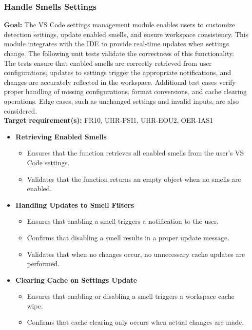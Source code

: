 \documentclass[12pt, titlepage]{article}
\begin{document}
\begin{enumerate}[label={\bf \textcolor{Maroon}{test-SRT-\arabic*}}, wide=0pt, font=\itshape]
\subsubsection{Handle Smells Settings}

\textbf{Goal:} The VS Code settings management module enables users to customize detection settings, update enabled smells, and ensure workspace consistency. This module integrates with the IDE to provide real-time updates when settings change. The following unit tests validate the correctness of this functionality.\\

\noindent The tests ensure that enabled smells are correctly retrieved from user configurations, updates to settings trigger the appropriate notifications, and changes are accurately reflected in the workspace. Additional test cases verify proper handling of missing configurations, format conversions, and cache clearing operations. Edge cases, such as unchanged settings and invalid inputs, are also considered.\\

\noindent \textbf{Target requirement(s):} FR10, UHR-PSI1, UHR-EOU2, OER-IAS1~\cite{SRS} \\

\begin{itemize}
    \item \textbf{Retrieving Enabled Smells}
    \begin{itemize}
        \item Ensures that the function retrieves all enabled smells from the user's VS Code settings.
        \item Validates that the function returns an empty object when no smells are enabled.
    \end{itemize}

    \item \textbf{Handling Updates to Smell Filters}
    \begin{itemize}
        \item Ensures that enabling a smell triggers a notification to the user.
        \item Confirms that disabling a smell results in a proper update message.
        \item Validates that when no changes occur, no unnecessary cache updates are performed.
    \end{itemize}

    \item \textbf{Clearing Cache on Settings Update}
    \begin{itemize}
        \item Ensures that enabling or disabling a smell triggers a workspace cache wipe.
        \item Confirms that cache clearing only occurs when actual changes are made.
    \end{itemize}


\end{itemize}
\end{enumerate}
\end{document}
